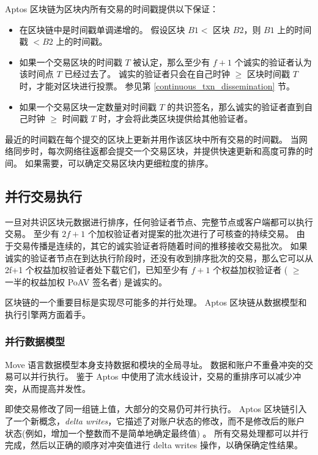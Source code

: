 \documentclass{article}
\begin{document}
Aptos 区块链为区块内所有交易的时间戳提供以下保证：

\begin{itemize}
\item 
在区块链中是时间戳单调递增的。 假设区块 $B1 < $  区块 $B2$，则 $B1$ 上的时间戳 $< B2$ 上的时间戳。

\item 如果一个交易区块的时间戳 $T$ 被认定，那么至少有 $f+1$ 个诚实的验证者认为该时间点 $T$ 已经过去了。 诚实的验证者只会在自己时钟 $\ge$ 区块时间戳 $T$ 时，才能对区块进行投票。 参见第 \ref{continuous_txn_dissemination} 节。
\item 如果一个交易区块一定数量对时间戳 $T$ 的共识签名，那么诚实的验证者直到自己时钟 $\ge$ 时间戳 $T$ 时，才会将此类区块提供给其他验证者。

\end{itemize}

最近的时间戳在每个提交的区块上更新并用作该区块中所有交易的时间戳。 当网络同步时，每次网络往返都会提交一个交易区块，并提供快速更新和高度可靠的时间。 如果需要，可以确定交易区块内更细粒度的排序。


\subsection{并行交易执行}
\label{subsec:parallel_transaction_execution}
一旦对共识区块元数据进行排序，任何验证者节点、完整节点或客户端都可以执行交易。 至少有 $2f+1$  个加权验证者对提案的批次进行了可核查的持续交易。 由于交易传播是连续的，其它的诚实验证者将随着时间的推移接收交易批次。 如果诚实的验证者节点在到达执行阶段时，还没有收到排序批次的交易，那么它可以从 2f+1 个权益加权验证者处下载它们，已知至少有 $f+1$ 个权益加权验证者 ( $\ge$ 一半的权益加权 PoAV 签名者) 是诚实的。

区块链的一个重要目标是实现尽可能多的并行处理。 Aptos 区块链从数据模型和执行引擎两方面着手。

\subsubsection{并行数据模型}

Move 语言数据模型本身支持数据和模块的全局寻址。 数据和账户不重叠冲突的交易可以并行执行。 鉴于 Aptos 中使用了流水线设计，交易的重排序可以减少冲突，从而提高并发性。

即使交易修改了同一组链上值，大部分的交易仍可并行执行。 Aptos 区块链引入了一个新概念，\emph{delta writes}，它描述了对账户状态的修改，而不是修改后的账户状态(例如，增加一个整数而不是简单地确定最终值) 。 所有交易处理都可以并行完成，然后以正确的顺序对冲突值进行 delta writes 操作，以确保确定性结果。
\end{document}
